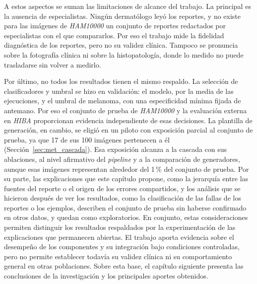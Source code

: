 A estos aspectos se suman las limitaciones de alcance del trabajo. La principal es la ausencia de especialistas.
Ningún dermatólogo leyó los reportes, y no existe para las imágenes de \emph{HAM10000} un conjunto de reportes
redactados por especialistas con el que compararlos. Por eso el trabajo mide la fidelidad diagnóstica de los reportes, pero no su validez clínica. Tampoco se pronuncia sobre la fotografía clínica ni sobre la histopatología, donde lo medido no puede trasladarse sin volver a medirlo.

Por último, no todos los resultados tienen el mismo respaldo. La selección de clasificadores y umbral se hizo en validación: el modelo, por la media de las ejecuciones, y el umbral de melanoma, con una especificidad mínima fijada de antemano. Por eso el conjunto de prueba de \emph{HAM10000} y la evaluación externa en \emph{HIBA} proporcionan evidencia independiente de esas decisiones. La plantilla de generación, en cambio, se eligió en un piloto con exposición parcial al conjunto de prueba, ya que 17 de sus 100 imágenes pertenecen a él (Sección~\ref{sec:met_cascada}). Esa exposición alcanza a la cascada con sus ablaciones, al nivel afirmativo del \emph{pipeline} y a la comparación de generadores, aunque esas imágenes representan alrededor del 1\,\% del conjunto de prueba. Por su parte, las explicaciones que este capítulo propone, como la jerarquía entre las fuentes del reporte o el origen de los errores compartidos, y los análisis que se hicieron después de ver los
resultados, como la clasificación de las fallas de los reportes o los ejemplos, describen el conjunto de prueba sin haberse
confirmado en otros datos, y quedan como exploratorios. En conjunto, estas consideraciones permiten distinguir los resultados respaldados por la experimentación de las explicaciones que permanecen abiertas. El trabajo aporta evidencia sobre el desempeño de los componentes y su integración bajo condiciones controladas, pero no permite establecer todavía su validez clínica ni su comportamiento general en otras poblaciones. Sobre esta base, el capítulo siguiente presenta las conclusiones de la investigación y los principales aportes obtenidos.
